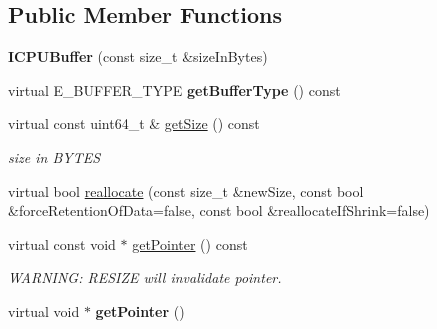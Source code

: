 \subsection*{Public Member Functions}
\begin{DoxyCompactItemize}
\item 
{\bfseries I\+C\+P\+U\+Buffer} (const size\+\_\+t \&size\+In\+Bytes)\hypertarget{classirr_1_1core_1_1ICPUBuffer_a6747a9dd7d4c2a42cd1fb910d629f4d2}{}\label{classirr_1_1core_1_1ICPUBuffer_a6747a9dd7d4c2a42cd1fb910d629f4d2}

\item 
virtual E\+\_\+\+B\+U\+F\+F\+E\+R\+\_\+\+T\+Y\+PE {\bfseries get\+Buffer\+Type} () const \hypertarget{classirr_1_1core_1_1ICPUBuffer_aa590d78d044e599618e936702ad3c151}{}\label{classirr_1_1core_1_1ICPUBuffer_aa590d78d044e599618e936702ad3c151}

\item 
virtual const uint64\+\_\+t \& \hyperlink{classirr_1_1core_1_1ICPUBuffer_addfd5f5b83f7ff9614d80b8679082897}{get\+Size} () const \hypertarget{classirr_1_1core_1_1ICPUBuffer_addfd5f5b83f7ff9614d80b8679082897}{}\label{classirr_1_1core_1_1ICPUBuffer_addfd5f5b83f7ff9614d80b8679082897}

\begin{DoxyCompactList}\small\item\em size in B\+Y\+T\+ES \end{DoxyCompactList}\item 
virtual bool \hyperlink{classirr_1_1core_1_1ICPUBuffer_ae223eb80a29ac3993b0bfa3e515ef5ce}{reallocate} (const size\+\_\+t \&new\+Size, const bool \&force\+Retention\+Of\+Data=false, const bool \&reallocate\+If\+Shrink=false)
\item 
virtual const void $\ast$ \hyperlink{classirr_1_1core_1_1ICPUBuffer_af4202485ff6630611fa9045c9f8018da}{get\+Pointer} () const \hypertarget{classirr_1_1core_1_1ICPUBuffer_af4202485ff6630611fa9045c9f8018da}{}\label{classirr_1_1core_1_1ICPUBuffer_af4202485ff6630611fa9045c9f8018da}

\begin{DoxyCompactList}\small\item\em W\+A\+R\+N\+I\+NG\+: R\+E\+S\+I\+ZE will invalidate pointer. \end{DoxyCompactList}\item 
virtual void $\ast$ {\bfseries get\+Pointer} ()\hypertarget{classirr_1_1core_1_1ICPUBuffer_aa63952d75dd3273a2a36feff79e9cf3d}{}\label{classirr_1_1core_1_1ICPUBuffer_aa63952d75dd3273a2a36feff79e9cf3d}

\end{DoxyCompactItemize}
